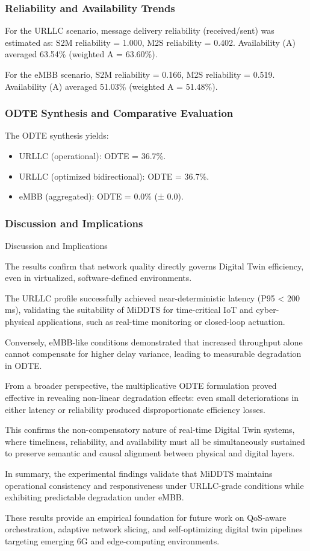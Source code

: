 \subsubsection{Reliability and Availability Trends}

For the URLLC scenario, message delivery reliability (received/sent) was estimated as: S2M reliability = 1.000, M2S reliability = 0.402. Availability (A) averaged 63.54\% (weighted A = 63.60\%).

For the eMBB scenario, S2M reliability = 0.166, M2S reliability = 0.519. Availability (A) averaged 51.03\% (weighted A = 51.48\%).

\subsubsection{ODTE Synthesis and Comparative Evaluation}

The ODTE synthesis yields:
\begin{itemize}
  \item URLLC (operational): ODTE = 36.7\%.
  \item URLLC (optimized bidirectional): ODTE = 36.7\%.
  \item eMBB (aggregated): ODTE = 0.0\% (± 0.0).
\end{itemize}

\subsubsection{Discussion and Implications}

Discussion and Implications 

 The results confirm that network quality directly governs Digital Twin efficiency, even in virtualized, software-defined environments.

 The URLLC profile successfully achieved near-deterministic latency (P95 < 200 ms), validating the suitability of MiDDTS for time-critical IoT and cyber-physical applications, such as real-time monitoring or closed-loop actuation.

 Conversely, eMBB-like conditions demonstrated that increased throughput alone cannot compensate for higher delay variance, leading to measurable degradation in ODTE.

 From a broader perspective, the multiplicative ODTE formulation proved effective in revealing non-linear degradation effects: even small deteriorations in either latency or reliability produced disproportionate efficiency losses.

 This confirms the non-compensatory nature of real-time Digital Twin systems, where timeliness, reliability, and availability must all be simultaneously sustained to preserve semantic and causal alignment between physical and digital layers.

 In summary, the experimental findings validate that MiDDTS maintains operational consistency and responsiveness under URLLC-grade conditions while exhibiting predictable degradation under eMBB.

 These results provide an empirical foundation for future work on QoS-aware orchestration, adaptive network slicing, and self-optimizing digital twin pipelines targeting emerging 6G and edge-computing environments.
